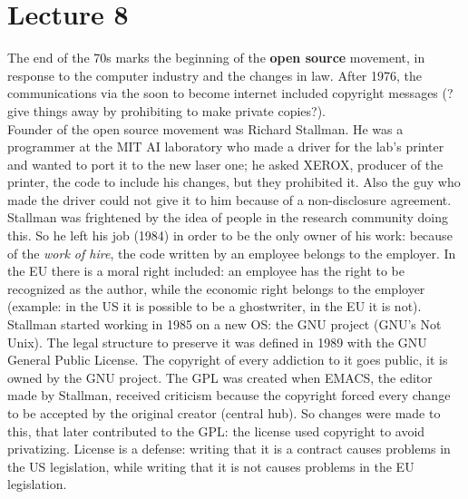 \documentclass[a4paper, 10pt, titlepage]{article}
\begin{document}
\section{Lecture 8}
The end of the 70s marks the beginning of the \textbf{open source} movement, in response to the computer industry and the changes in law. After 1976, the communications via the soon to become internet included copyright messages (?give things away by prohibiting to make private copies?). \\
Founder of the open source movement was Richard Stallman. He was a programmer at the MIT AI laboratory who made a driver for the lab's printer and wanted to port it to the new laser one; he asked XEROX, producer of the printer, the code to include his changes, but they prohibited it. Also the guy who made the driver could not give it to him because of a non-disclosure agreement. Stallman was frightened by the idea of people in the research community doing this. So he left his job (1984) in order to be the only owner of his work: because of the \textit{work of hire}, the code written by an employee belongs to the employer. In the EU there is a moral right included: an employee has the right to be recognized as the author, while the economic right belongs to the employer (example: in the US it is possible to be a ghostwriter, in the EU it is not). \\
Stallman started working in 1985 on a new OS: the GNU project (GNU's Not Unix). The legal structure to preserve it was defined in 1989 with the GNU General Public License.
The copyright of every addiction to it goes public, it is owned by the GNU project. The GPL was created when EMACS, the editor made by Stallman, received criticism because the copyright forced every change to be accepted by the original creator (central hub). So changes were made to this, that later contributed to the GPL: the license used copyright to avoid privatizing. License is a defense: writing that it is a contract causes problems in the US legislation, while writing that it is not causes problems in the EU legislation.
\end{document}
